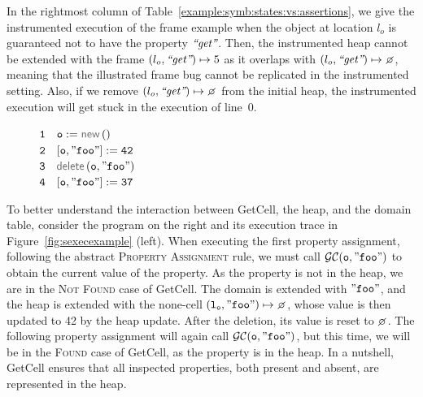  
 
 In the rightmost column of Table~\ref{example:symb:states:vs:assertions}, we give the instrumented 
 execution of the frame example when
 the object at location $l_o$ is guaranteed not to have the property $\text{{\it ``get''}}$. 
 Then, the  instrumented heap cannot be extended  with 
 the frame $(l_o, \text{{\it ``get''}}) \mapsto 5$ as it overlaps with $(\loc_o, \litstring{get}) \mapsto \none$, meaning 
 that the illustrated frame bug cannot be replicated in the instrumented setting.  
 Also, if we remove $(\loc_o, \litstring{get}) \mapsto \none$ from the initial heap, 
 the instrumented execution will get stuck in the execution of line~$0$. 

\begin{figure}
\vspace*{-0.5cm}
{\small
\hspace*{-0.5cm} $\mathtt{1\quad o := \jsilnew ()}$ \\[-0.06cm]
\hspace*{-0.5cm} $\mathtt{2\quad [o, "foo"] := 42}$ \\[-0.06cm]
\hspace*{-0.5cm} $\mathtt{3\quad \jsildelete(o, "foo")}$ \\ [-0.06cm]
\hspace*{-0.5cm} $\mathtt{4\quad [o, "foo"] := 37}$ 
}
\vspace*{-0.25cm}
\end{figure}

To better understand the interaction between GetCell, the heap, and the domain table, consider the 
 program on the right and its execution trace in Figure~\ref{fig:sexecexample} (left). When executing the first property assignment, following the abstract \textsc{Property Assignment} rule, we must call $\mathcal{GC}(\mathtt{o, "foo"})$ to obtain the current value of the property. As the property is not in the heap, we are in the \textsc{Not Found} case of GetCell. The domain is extended with $\mathtt{"foo"}$, and the heap is extended with the none-cell $\mathtt{(\loc_o, "foo")} \mapsto \none$, whose value is then updated to 42 by the heap update. After the deletion, its value is reset to $\none$. The following property assignment will again call $\mathcal{GC}(\mathtt{o, "foo"})$, but this time, we will be in the \textsc{Found} case of GetCell, as the property is in the heap.
In a nutshell, GetCell ensures that all inspected properties, both present and absent, are represented in the heap.

